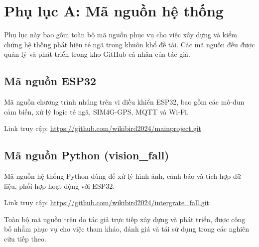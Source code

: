 
\chapter{Phụ lục A: Mã nguồn hệ thống}

Phụ lục này bao gồm toàn bộ mã nguồn phục vụ cho việc xây dựng và kiểm chứng hệ thống phát hiện té ngã trong khuôn khổ đề tài. 
Các mã nguồn đều được quản lý và phát triển trong kho GitHub cá nhân của tác giả. 

\section*{Mã nguồn ESP32}
Mã nguồn chương trình nhúng trên vi điều khiển ESP32, bao gồm các mô-đun cảm biến, xử lý logic té ngã, SIM4G-GPS, MQTT và Wi-Fi.  

\noindent
Link truy cập:  
\url{https://github.com/wikibird2024/mainproject.git}

\section*{Mã nguồn Python (vision\_fall)}
Mã nguồn hệ thống Python dùng để xử lý hình ảnh, cảnh báo và tích hợp dữ liệu, phối hợp hoạt động với ESP32.  

\noindent
Link truy cập:  
\url{https://github.com/wikibird2024/intergrate_fall.git}

\bigskip
Toàn bộ mã nguồn trên do tác giả trực tiếp xây dựng và phát triển, được công bố nhằm phục vụ cho việc tham khảo, đánh giá và tái sử dụng trong các nghiên cứu tiếp theo.

